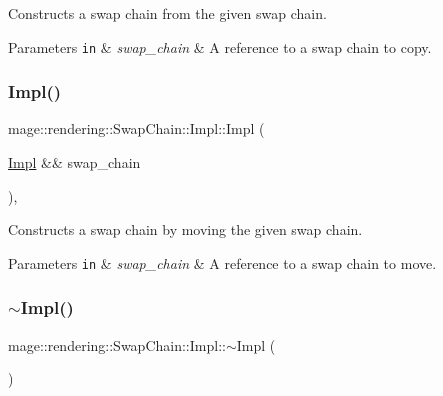 Constructs a swap chain from the given swap chain.


\begin{DoxyParams}[1]{Parameters}
\mbox{\tt in}  & {\em swap\+\_\+chain} & A reference to a swap chain to copy. \\
\hline
\end{DoxyParams}
\mbox{\label{classmage_1_1rendering_1_1_swap_chain_1_1_impl_aed29d0cdb54323cd670e5a690faed394}} 
\subsubsection{\texorpdfstring{Impl()}{Impl()}\hspace{0.1cm}{\footnotesize\ttfamily [3/3]}}
{\footnotesize\ttfamily mage\+::rendering\+::\+Swap\+Chain\+::\+Impl\+::\+Impl (\begin{DoxyParamCaption}\item[{\mbox{\hyperlink{classmage_1_1rendering_1_1_swap_chain_1_1_impl}{Impl}} \&\&}]{swap\+\_\+chain }\end{DoxyParamCaption})\hspace{0.3cm}{\ttfamily [default]}, {\ttfamily [noexcept]}}

Constructs a swap chain by moving the given swap chain.


\begin{DoxyParams}[1]{Parameters}
\mbox{\tt in}  & {\em swap\+\_\+chain} & A reference to a swap chain to move. \\
\hline
\end{DoxyParams}
\mbox{\label{classmage_1_1rendering_1_1_swap_chain_1_1_impl_ac41af1d1c99d284152447381045c169b}} 
\subsubsection{\texorpdfstring{$\sim$\+Impl()}{~Impl()}}
{\footnotesize\ttfamily mage\+::rendering\+::\+Swap\+Chain\+::\+Impl\+::$\sim$\+Impl (\begin{DoxyParamCaption}{ }\end{DoxyParamCaption})}

